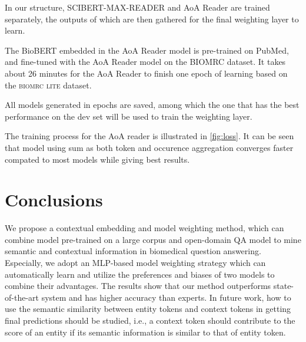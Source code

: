 \documentclass[sigconf, screen]{acmart}
\newcommand{\biomrclite}{{\scshape{biomrc lite}}\xspace}
\newcommand{\biobert}{Bio\-BERT\xspace}
\newcommand{\aoa}{AoA Reader\xspace}
\begin{document}
In our structure, SCIBERT-MAX-READER and \aoa are trained separately, the outputs of which are then gathered for the final weighting layer to learn.

The \biobert embedded in the \aoa model is pre-trained on PubMed, and fine-tuned with the \aoa model on the BIOMRC dataset. It takes about 26 minutes for the \aoa to finish one epoch of learning based on the \biomrclite dataset.

All models generated in epochs are saved, among which the one that has the best performance on the dev set will be used to train the weighting layer.

The training process for the AoA reader is illustrated in \cref{fig:loss}. It can be seen that model using sum as both token and occurence aggregation converges faster compated to most models while giving best results.

\section{Conclusions}

We propose a contextual embedding and model weighting method, which can combine model pre-trained on a large corpus and open-domain QA model to mine semantic and contextual information in biomedical question answering. Especially, we adopt an MLP-based model weighting strategy which can automatically learn and utilize the preferences and biases of two models to combine their advantages. The results show that our method outperforms state-of-the-art system and has higher accuracy than experts. In future work, how to use the semantic similarity between entity tokens and context tokens in getting final predictions should be studied, i.e., a context token should contribute to the score of an entity if its semantic information is similar to that of entity token.



\end{document}
